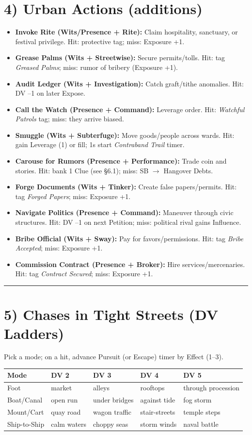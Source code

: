\documentclass[11pt]{article}
\newcommand{\sectionrule}{\vspace{0.5em}\noindent\textcolor{gray}{\rule{\textwidth}{0.4pt}}\par\vspace{0.5em}}
\begin{document}
\section*{4) Urban Actions (additions)}
\begin{itemize}
    \item \textbf{Invoke Rite (Wits/Presence + Rite):} Claim hospitality, sanctuary, or festival privilege. Hit: protective tag; miss: Exposure +1.
    \item \textbf{Grease Palms (Wits + Streetwise):} Secure permits/tolls. Hit: tag \textit{Greased Palms}; miss: rumor of bribery (Exposure +1).
    \item \textbf{Audit Ledger (Wits + Investigation):} Catch graft/tithe anomalies. Hit: DV --1 on later Expose.
    \item \textbf{Call the Watch (Presence + Command):} Leverage order. Hit: \textit{Watchful Patrols} tag; miss: they arrive biased.
    \item \textbf{Smuggle (Wits + Subterfuge):} Move goods/people across wards. Hit: gain Leverage (1) or fill; 1s start \textit{Contraband Trail} timer.
    \item \textbf{Carouse for Rumors (Presence + Performance):} Trade coin and stories. Hit: bank 1 Clue (see \S6.1); miss: SB $\rightarrow$ Hangover Debts.
    \item \textbf{Forge Documents (Wits + Tinker):} Create false papers/permits. Hit: tag \textit{Forged Papers}; miss: Exposure +1.
    \item \textbf{Navigate Politics (Presence + Command):} Maneuver through civic structures. Hit: DV --1 on next Petition; miss: political rival gains Influence.
    \item \textbf{Bribe Official (Wits + Sway):} Pay for favors/permissions. Hit: tag \textit{Bribe Accepted}; miss: Exposure +1.
    \item \textbf{Commission Contract (Presence + Broker):} Hire services/mercenaries. Hit: tag \textit{Contract Secured}; miss: Exposure +1.
\end{itemize}

\sectionrule

\section*{5) Chases in Tight Streets (DV Ladders)}
Pick a mode; on a hit, advance Pursuit (or Escape) timer by Effect (1--3).  

\begin{tabular}{@{}lllll@{}}
\toprule
Mode & DV 2 & DV 3 & DV 4 & DV 5 \\
\midrule
Foot & market & alleys & rooftops & through procession \\
Boat/Canal & open run & under bridges & against tide & fog storm \\
Mount/Cart & quay road & wagon traffic & stair-streets & temple steps \\
Ship-to-Ship & calm waters & choppy seas & storm winds & naval battle \\
\bottomrule
\end{tabular}
\end{document}
